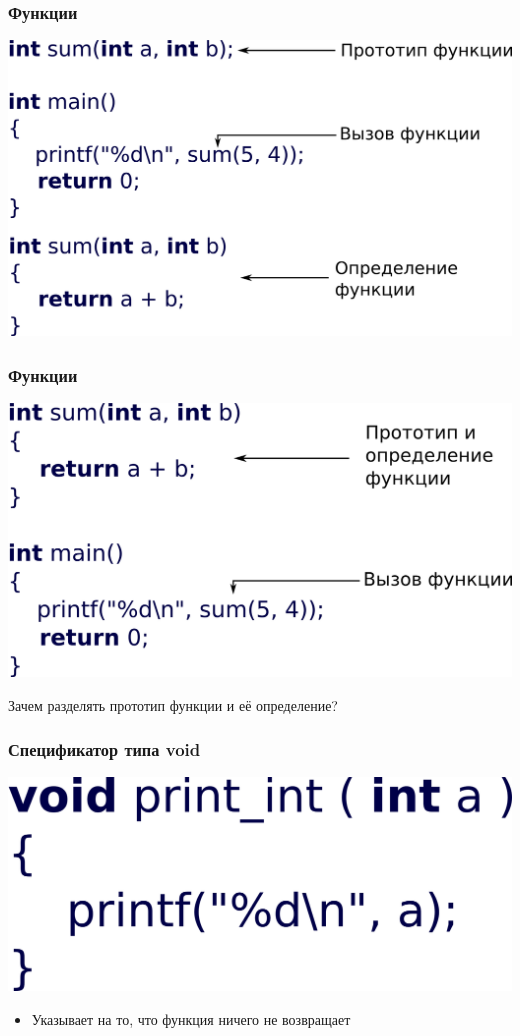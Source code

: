 \documentclass[14pt,pdf,hyperref={unicode}]{beamer}
\begin{document}
\begin{frame}[fragile]
\frametitle{Функции} 
\begin{center}
\includegraphics[width=0.8\linewidth]{images/function_summary.png}
\end{center}
\end{frame}

\begin{frame}[fragile]
\frametitle{Функции} 
\begin{center}
\includegraphics[width=0.8\linewidth]{images/function_summary2.png}

Зачем разделять прототип функции и её определение?
\end{center}
\end{frame}


\begin{frame}[fragile]
\frametitle{Спецификатор типа void} 
\begin{center}
\includegraphics[width=0.45\linewidth]{images/function_void.png}
\end{center}
\begin{itemize}
\item Указывает на то, что функция ничего не возвращает
\end{itemize}
\end{frame}
\end{document}
